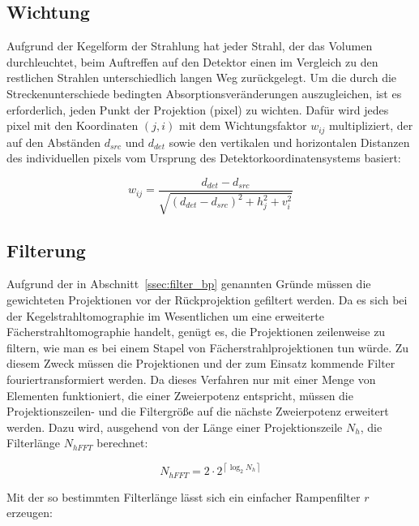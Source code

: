 \subsection{Wichtung}\label{ssec:fdk_wichtung}

Aufgrund der Kegelform der Strahlung hat jeder Strahl, der das Volumen durchleuchtet, beim Auftreffen auf den Detektor
einen im Vergleich zu den restlichen Strahlen unterschiedlich langen Weg zurückgelegt. Um die durch die
Streckenunterschiede bedingten Absorptionsveränderungen auszugleichen, ist es erforderlich, jeden Punkt der Projektion
(\gls{pixel}) zu wichten.
Dafür wird jedes \gls{pixel} mit den Koordinaten $(j, i)$ mit dem Wichtungsfaktor $w_{ij}$ multipliziert, der auf den
Abständen $d_{src}$ und $d_{det}$ sowie den vertikalen und horizontalen Distanzen des individuellen \gls{pixel}s vom
Ursprung des Detektorkoordinatensystems basiert:

\begin{equation}\label{eq:wichtung}
    w_{ij} = \frac{d_{det} - d_{src}}{\sqrt{(d_{det} - d_{src})^2 + h_j^2 + v_i^2}}
\end{equation}

\subsection{Filterung}\label{ssec:fdk_filter}

Aufgrund der in Abschnitt~\ref{ssec:filter_bp} genannten Gründe müssen die gewichteten Projektionen vor der Rückprojektion
gefiltert werden. Da es sich bei der Kegelstrahltomographie im Wesentlichen um eine erweiterte Fächerstrahltomographie
handelt, genügt es, die Projektionen zeilenweise zu filtern, wie man es bei einem {\glqq}Stapel{\grqq} von
Fächerstrahlprojektionen tun würde. Zu diesem Zweck müssen die Projektionen und der zum Einsatz kommende Filter
fouriertransformiert werden. Da dieses Verfahren nur mit einer Menge von Elementen funktioniert, die einer Zweierpotenz
entspricht, müssen die Projektionszeilen- und die Filtergröße auf die nächste Zweierpotenz erweitert werden. Dazu wird,
ausgehend von der Länge einer Projektionszeile $N_h$, die Filterlänge $N_{hFFT}$ berechnet:

\begin{equation}
    N_{hFFT} = 2 \cdot 2^{\left\lceil \log_{2} N_h \right\rceil}
\end{equation}

Mit der so bestimmten Filterlänge lässt sich ein einfacher Rampenfilter $r$ erzeugen:

